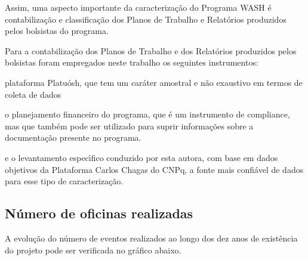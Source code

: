 \documentclass[
12pt,		%
openright,	%
twoside,  %
a4paper,			%
chapter=TITLE,		%
english,			%
french,				%
spanish,			%
brazil				%
]{USPSC-classe/USPSC}
\begin{document}
Assim, uma aspecto importante da caracteriza\c{c}\~ao do Programa WASH \'e contabiliza\c{c}\~ao e classifica\c{c}\~ao dos Planos de Trabalho e Relat\'orios produzidos pelos bolsistas do programa.

















Para a contabiliza\c{c}\~ao dos Planos de Trabalho e dos Relat\'orios produzidos pelos bolsistas foram empregados neste trabalho os seguintes instrumentos:


















\begin{alineas}
\item plataforma Platu\'osh, que tem um car\'ater amostral e n\~ao exaustivo em termos de coleta de dados
\item o planejamento financeiro do programa, que \'e um instrumento de compliance, mas que tamb\'em pode ser utilizado para suprir informa\c{c}\~oes sobre a documenta\c{c}\~ao presente no programa.
\item e o levantamento espec\'{\i}fico conduzido por esta autora, com base em dados objetivos da Plataforma Carlos Chagas do CNPq, a fonte mais confi\'avel de dados para esse tipo de caracteriza\c{c}\~ao.
\end{alineas}

\subsection[N\'umero de oficinas realizadas]{N\'umero de oficinas realizadas}\label{N\'umero de oficinas realizadas}
A evolu\c{c}\~ao do n\'umero de eventos realizados ao longo dos dez anos de exist\^encia do projeto pode ser verificada no gr\'afico abaixo.
\end{document}
